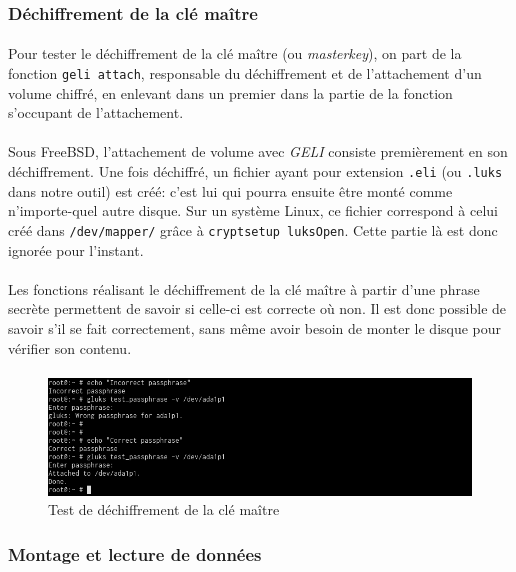 \subsubsection{Déchiffrement de la clé maître}
\paragraph{}
Pour tester le déchiffrement de la clé maître (ou \textit{masterkey}), on part
de la fonction \texttt{geli attach}, responsable du déchiffrement et de
l'attachement d'un volume chiffré, en enlevant dans un premier dans la partie de
la fonction s'occupant de l'attachement.
\paragraph{}
Sous FreeBSD, l'attachement de volume avec \textit{GELI} consiste premièrement
en son déchiffrement. Une fois déchiffré, un fichier ayant pour extension
\texttt{.eli} (ou \texttt{.luks} dans notre outil) est créé: c'est lui qui
pourra ensuite être monté comme n'importe-quel autre disque. Sur un système
Linux, ce fichier correspond à celui créé dans \texttt{/dev/mapper/} grâce à
\texttt{cryptsetup luksOpen}. Cette partie là est donc ignorée pour l'instant.
\paragraph{}
Les fonctions réalisant le déchiffrement de la clé maître à partir d'une phrase
secrète permettent de savoir si celle-ci est correcte où non. Il est donc
possible de savoir s'il se fait correctement, sans même avoir besoin de monter
le disque pour vérifier son contenu.
\paragraph{}
\begin{figure}[h]
\centering
\includegraphics[width=.9\linewidth]{tests/freebsd_test_passphrase.png}
\caption{\label{fig:freebsd_test_passphrase}Test de déchiffrement de la clé maître}
\end{figure}

\subsubsection{Montage et lecture de données}
